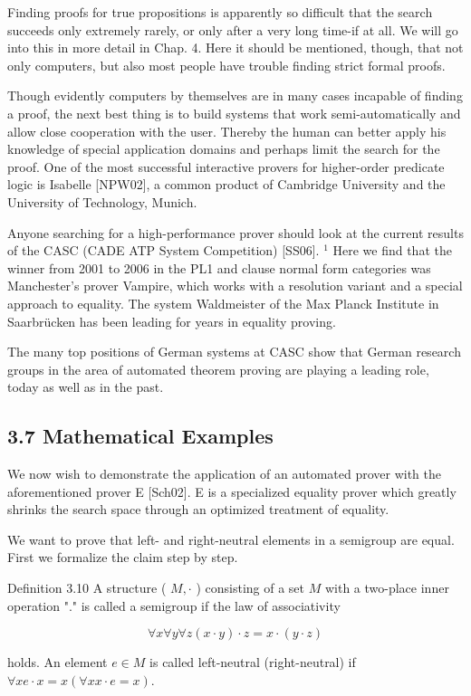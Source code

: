 \documentclass[10pt]{article}
\begin{document}
Finding proofs for true propositions is apparently so difficult that the search succeeds only extremely rarely, or only after a very long time-if at all. We will go into this in more detail in Chap. 4. Here it should be mentioned, though, that not only computers, but also most people have trouble finding strict formal proofs.

Though evidently computers by themselves are in many cases incapable of finding a proof, the next best thing is to build systems that work semi-automatically and allow close cooperation with the user. Thereby the human can better apply his knowledge of special application domains and perhaps limit the search for the proof. One of the most successful interactive provers for higher-order predicate logic is Isabelle [NPW02], a common product of Cambridge University and the University of Technology, Munich.

Anyone searching for a high-performance prover should look at the current results of the CASC (CADE ATP System Competition) [SS06]. ${ }^{1}$ Here we find that the winner from 2001 to 2006 in the PL1 and clause normal form categories was Manchester's prover Vampire, which works with a resolution variant and a special approach to equality. The system Waldmeister of the Max Planck Institute in Saarbrücken has been leading for years in equality proving.

The many top positions of German systems at CASC show that German research groups in the area of automated theorem proving are playing a leading role, today as well as in the past.

\subsection*{3.7 Mathematical Examples}
We now wish to demonstrate the application of an automated prover with the aforementioned prover E [Sch02]. E is a specialized equality prover which greatly shrinks the search space through an optimized treatment of equality.

We want to prove that left- and right-neutral elements in a semigroup are equal. First we formalize the claim step by step.

Definition 3.10 A structure ( $M, \cdot$ ) consisting of a set $M$ with a two-place inner operation "." is called a semigroup if the law of associativity

$$
\forall x \forall y \forall z(x \cdot y) \cdot z=x \cdot(y \cdot z)
$$

holds. An element $e \in M$ is called left-neutral (right-neutral) if $\forall x e \cdot x=x(\forall x x \cdot e=x)$.
\end{document}
